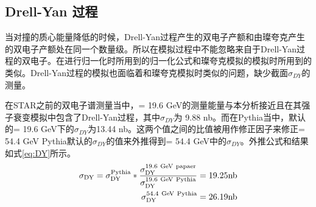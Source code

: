 \subsection{Drell-Yan 过程}
当对撞的质心能量降低的时候，Drell-Yan过程产生的双电子产额和由璨夸克产生的双电子产额处在同一个数量级。所以在模拟过程中不能忽略来自于Drell-Yan过程的双电子。在进行归一化时所用到的归一化公式和璨夸克模拟的模拟时所用到的类似。Drell-Yan过程的模拟也面临着和璨夸克模拟时类似的问题，缺少截面$\sigma_{DY}$的测量。

在STAR之前的双电子谱测量当中，\sNN = 19.6 GeV的测量能量与本分析接近且在其强子衰变模拟中包含了Drell-Yan过程，其中$\sigma_{DY}$为 9.88 nb\cite{STAR:2015zal}。而在Pythia当中，默认的\sNN = 19.6 GeV下的$\sigma_{DY}$为13.44 nb。这两个值之间的比值被用作修正因子来修正\sNN = 54.4 GeV Pythia默认的$\sigma_{DY}$的值来外推得到\sNN = 54.4 GeV中的$\sigma_{DY}$。外推公式和结果如式\ref{eq:DY}所示。
\begin{equation}
    \label{eq:DY}
    \begin{split}
        \rm{ \sigma_{DY} = \sigma_{DY}^{Pythia}*\frac{\sigma_{DY}^{19.6~GeV~papaer}}{\sigma_{DY}^{19.6~GeV~Pythia}} = 19.25 nb } \\
        \rm{  \sigma_{DY}^{54.4~GeV~Pythia} = 26.19 nb }
    \end{split}
\end{equation}